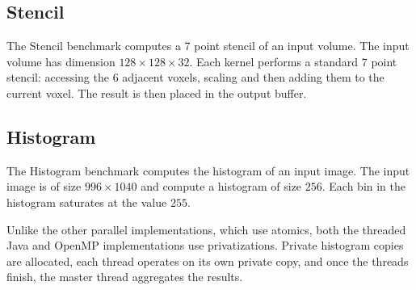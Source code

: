 \subsection{Stencil}

The Stencil benchmark computes a 7 point stencil of an input volume. 
The input volume has dimension $128 \times 128 \times 32$.
Each kernel performs a standard 7 point stencil: accessing the $6$ adjacent voxels,
	scaling and then adding them to the current voxel.
The result is then placed in the output buffer.

\subsection{Histogram}

The Histogram benchmark computes the histogram of an input image.
The input image is of size $996 \times 1040$ and compute a 
	histogram of size $256$.
Each bin in the histogram saturates at the value $255$.

Unlike the other parallel implementations, which use atomics, both the
	threaded Java and OpenMP implementations use privatizations.
Private histogram copies are allocated, each thread 
	operates on its own private copy, and once the threads finish, the
	master thread aggregates the results.

